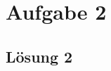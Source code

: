 \documentclass[main.tex]{subfiles}
\begin{document}
\section{Aufgabe 2}

\subsection{Lösung 2}
\end{document}
